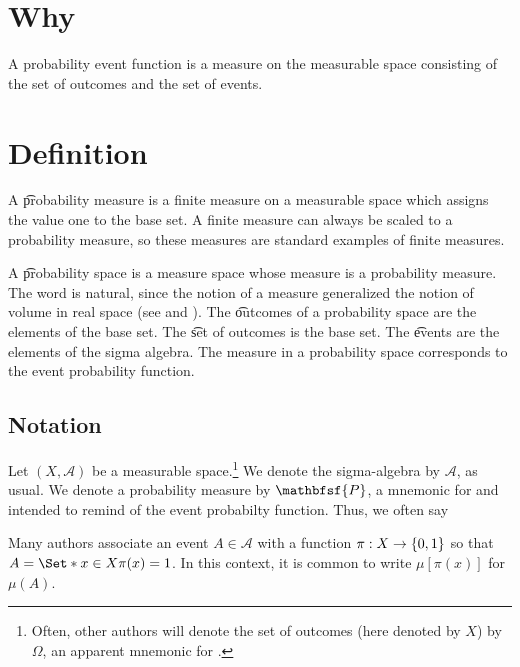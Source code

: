 

\section*{Why}

A probability event function is a measure on the measurable space consisting of the set of outcomes and the set of events.

\section*{Definition}

A \t{probability measure} is a finite measure on a measurable space which assigns the value one to the base set.
A finite measure can always be scaled to a probability measure, so these measures are standard examples of finite measures.

A \t{probability space} is a measure space whose measure is a probability measure.
The word  is natural, since the notion of a measure generalized the notion of volume in real space (see and ).
The \t{outcomes} of a probability space are the elements of the base set.
The \t{set of outcomes} is the base set.
The \t{events} are the elements of the sigma algebra.
The measure in a probability space corresponds to the event probability function.

\subsection*{Notation}

Let $(X, \mathcal{A} )$ be a measurable space.\footnote{Often, other authors will denote the set of outcomes (here denoted by $X$) by $\Omega $, an apparent mnemonic for .}
We denote the sigma-algebra by $\mathcal{A} $, as usual.
We denote a probability measure by $\mathbfsf{P} $, a mnemonic for  and intended to remind of the event probabilty function.
Thus, we often say 

Many authors associate an event $A \in \mathcal{A} $ with a function $\pi : X \to \{0, 1\}$ so that $A = \Set*{x \in X}{\pi (x) = 1}$.
In this context, it is common to write $\mu [\pi (x)]$ for $\mu (A)$.

\blankpage